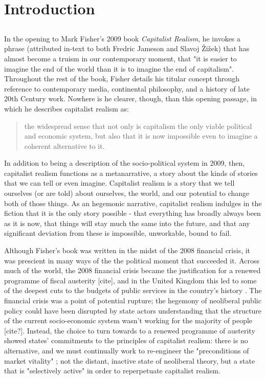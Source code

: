 \chapter{Introduction}
\label{ch:1}

\section{}
\label{sec:}

In the opening to Mark Fisher's 2009 book \emph{Capitalist Realism}, he invokes a phrase (attributed in-text to both Fredric Jameson and Slavoj Žižek) that has almost become a truism in our contemporary moment, that "it is easier to imagine the end of the world than it is to imagine the end of capitalism". Throughout the rest of the book, Fisher details his titular concept through reference to contemporary media, continental philosophy, and a history of late 20th Century work. Nowhere is he clearer, though, than this opening passage, in which he describes capitalist realism as:

\begin{quote}
    the widespread sense that not only is capitalism the only viable political and economic system, but also that it is now impossible even to imagine a coherent alternative to it. \citep{fisher_capitalist_2009}
\end{quote}

In addition to being a description of the socio-political system in 2009, then, capitalist realism functions as a metanarrative, a story about the kinds of stories that we can tell or even imagine. Capitalist realism is a story that we tell ourselves (or are told) about ourselves, the world, and our potential to change both of those things. As an hegemonic narrative, capitalist realism indulges in the fiction that it is the only story possible - that everything has broadly always been as it is now, that things will stay much the same into the future, and that any significant deviation from these is impossible, unworkable, bound to fail. 

Although Fisher's book was written in the midst of the 2008 financial crisis, it was prescient in many ways of the the political moment that succeeded it. Across much of the world, the 2008 financial crisis became the justification for a renewed programme of fiscal austerity [cite], and in the United Kingdom this led to some of the deepest cuts to the budgets of public services in the country's history \citep{lowndes_local_2012}. The financial crisis was a point of potential rupture; the hegemony of neoliberal public policy could have been disrupted by state actors understanding that the structure of the current socio-economic system wasn't working for the majority of people [cite?]. Instead, the choice to turn towards to a renewed programme of austerity showed states' commitments to the principles of capitalist realism: there is no alternative, and we must continually work to re-engineer the "preconditions of market vitality" \citep{connolly_fragility_2013}; not the distant, inactive state of neoliberal theory, but a state that is "selectively active" \citep{harvey_brief_2007} in order to reperpetuate capitalist realism.


